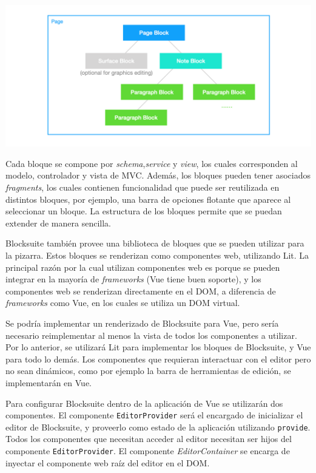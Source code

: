 \documentclass[a4paper, oneside, final]{scrartcl}
\begin{document}
\includegraphics[width=\textwidth]{images/block-nesting.png}

Cada bloque se compone por \textit{schema},\textit{service} y \textit{view}, los cuales corresponden al modelo, controlador y vista de MVC. Además, los bloques pueden tener asociados \textit{fragments}, los cuales contienen funcionalidad que puede ser reutilizada en distintos bloques, por ejemplo, una barra de opciones flotante que aparece al seleccionar un bloque. La estructura de los bloques permite que se puedan extender de manera sencilla.

Blocksuite también provee una biblioteca de bloques que se pueden utilizar para la pizarra. Estos bloques se renderizan como componentes web, utilizando Lit. La principal razón por la cual utilizan componentes web es porque se pueden integrar en la mayoría de \textit{frameworks} (Vue tiene buen soporte), y los componentes web se renderizan directamente en el DOM, a diferencia de \textit{frameworks} como Vue, en los cuales se utiliza un DOM virtual.

Se podría implementar un renderizado de Blocksuite para Vue, pero sería necesario reimplementar al menos la vista de todos los componentes a utilizar. Por lo anterior, se utilizará Lit para implementar los bloques de Blocksuite, y Vue para todo lo demás. Los componentes que requieran interactuar con el editor pero no sean dinámicos, como por ejemplo la barra de herramientas de edición, se implementarán en Vue.

Para configurar Blocksuite dentro de la aplicación de Vue se utilizarán dos componentes. El componente \texttt{EditorProvider} será el encargado de inicializar el editor de Blocksuite, y proveerlo como estado de la aplicación utilizando \texttt{provide}. Todos los componentes que necesitan acceder al editor necesitan ser hijos del componente \texttt{EditorProvider}. El componente \textit{EditorContainer} se encarga de inyectar el componente web raíz del editor en el DOM.
\end{document}
